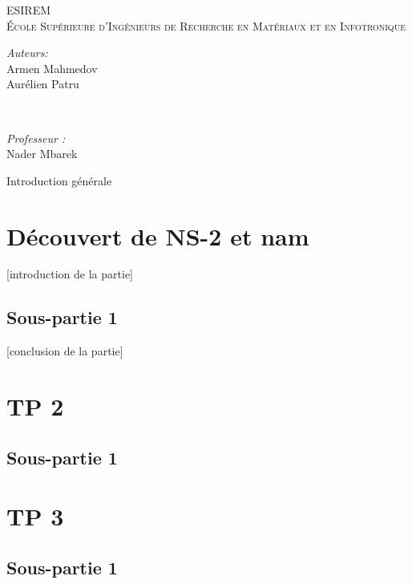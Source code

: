 \documentclass[11pt]{article}
\begin{document}
\begin{titlepage}
	\vfill 
	\begin{center}
        \textsc{\large
        	ESIREM \\
			École Supérieure d'Ingénieurs de Recherche en Matériaux et en Infotronique\\       	
			[2cm]
		}
	\end{center}

	\begin{minipage}{0.5\textwidth}
		\begin{flushleft} \large
			\emph{Auteurs:}\\
			Armen Mahmedov \\
			Aurélien Patru
		\end{flushleft}
	\end{minipage}
	~
	\begin{minipage}{0.5\textwidth}
		\begin{flushright}\large
			\emph{Professeur :} \\
			Nader Mbarek \\
		\end{flushright}
	\end{minipage}
        
\end{titlepage}
  
\newpage
\strut
\newpage

\tableofcontents


\pagebreak

Introduction générale 


\section{Découvert de NS-2 et nam}
[introduction de la partie]

\subsection{Sous-partie 1}


[conclusion de la partie]

\section{TP 2}
\subsection{Sous-partie 1}


\section{TP 3}
\subsection{Sous-partie 1}
\end{document}
